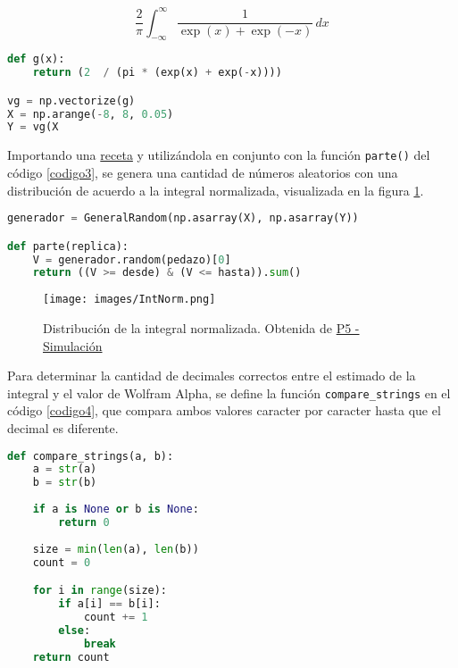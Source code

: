 \documentclass{report}
\begin{document}
\begin{equation}\label{eq2}
    \frac{2}{\pi}\int_{-\infty}^{\infty} \frac{1}{\exp{(x)} + \exp{(-x)}} \,dx
\end{equation}

\begin{lstlisting}[caption=Normalizaci\'on de la Integral, label=codigo2, language=Python]
def g(x):
    return (2  / (pi * (exp(x) + exp(-x))))

vg = np.vectorize(g)
X = np.arange(-8, 8, 0.05)
Y = vg(X
\end{lstlisting}

Importando una \href{https://github.com/satuelisa/Simulation/blob/master/MonteCarlo/GeneralRandom.py}{receta} y utiliz\'andola en conjunto con la funci\'on \texttt{parte()} del c\'odigo \ref{codigo3}, se genera una cantidad de n\'umeros aleatorios con una distribuci\'on de acuerdo a la integral normalizada, visualizada en la figura \ref{fig1}.

\begin{lstlisting}[caption= Generaci\'on de N\'umeros Aleatorios, label=codigo3, language=Python]
generador = GeneralRandom(np.asarray(X), np.asarray(Y))

def parte(replica):
    V = generador.random(pedazo)[0]
    return ((V >= desde) & (V <= hasta)).sum()
\end{lstlisting}

\begin{figure}[h!]
    \centering
    \texttt{[image: images/IntNorm.png]}
    \caption{Distribuci\'on de la integral normalizada. Obtenida de \href{https://satuelisa.github.io/simulation/p5.html}{P5 - Simulaci\'on}}
    \label{fig1}
\end{figure}

Para determinar la cantidad de decimales correctos entre el estimado de la integral y el valor de Wolfram Alpha, se define la funci\'on \texttt{compare\_strings} en el c\'odigo \ref{codigo4}, que compara ambos valores caracter por caracter hasta que el decimal es diferente.

\begin{lstlisting}[caption= Comparaci\'on de Decimales, label=codigo4, language=Python]
def compare_strings(a, b):
    a = str(a)
    b = str(b)
    
    if a is None or b is None:
        return 0
    
    size = min(len(a), len(b))
    count = 0

    for i in range(size):
        if a[i] == b[i]:
            count += 1
        else:
            break
    return count
\end{lstlisting}
\end{document}
